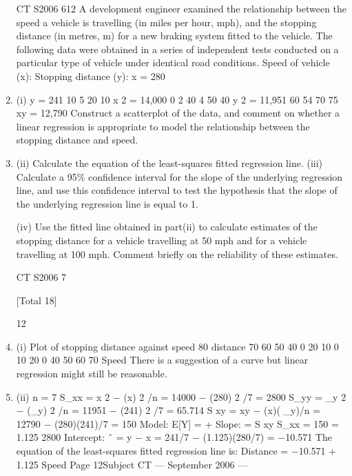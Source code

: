 \documentclass[a4paper,12pt]{article}
\begin{document}
\begin{enumerate}

CT S2006
612
A development engineer examined the relationship between the speed a vehicle is travelling (in miles per hour, mph), and the stopping distance (in metres, m) for a new
braking system fitted to the vehicle. The following data were obtained in a series of
independent tests conducted on a particular type of vehicle under identical road conditions.
Speed of vehicle (x):
Stopping distance (y):
x = 280
\item (i)
y = 241
10
5
20
10
x 2 = 14,000
0
2
40
4
50
40
y 2 = 11,951
60
54
70
75
xy = 12,790
Construct a scatterplot of the data, and comment on whether a linear
regression is appropriate to model the relationship between the stopping
distance and speed. 
\item (ii) Calculate the equation of the least-squares fitted regression line. 
(iii) Calculate a 95\% confidence interval for the slope of the underlying regression
line, and use this confidence interval to test the hypothesis that the slope of the
underlying regression line is equal to 1.

(iv) Use the fitted line obtained in part(ii) to calculate estimates of the stopping
distance for a vehicle travelling at 50 mph and for a vehicle travelling at 100
mph.
Comment briefly on the reliability of these estimates.

CT S2006
7

[Total 18]

12
\item (i)
Plot of stopping distance against speed
80
distance
70
60
50
40
0
20
10
0
10
20
0
40
50
60
70
Speed
There is a suggestion of a curve but linear regression might still be reasonable.
\item (ii)
n = 7
S_{xx} = \sigma x 2 − (\sigma x) 2 /n = 14000 − (280) 2 /7 = 2800
S_{yy} = \sigma_y 2 − (\sigma_y) 2 /n = 11951 − (241) 2 /7 = 65.714
S xy = \sigma xy − (\sigma x)( \sigma_y)/n = 12790 − (280)(241)/7 = 150
Model: E[Y] = \alpha + \betax
Slope: \hat{\beta} =
S xy
S_{xx}
=
150
= 1.125
2800
Intercept: \alpha ˆ = y − \hat{\beta} x = 241/7 − (1.125)(280/7) = −10.571
The equation of the least-squares fitted regression line is:
Distance = −10.571 + 1.125 Speed
Page 12Subject CT  — September 2006 — 


\end{enumerate}
\end{document}
